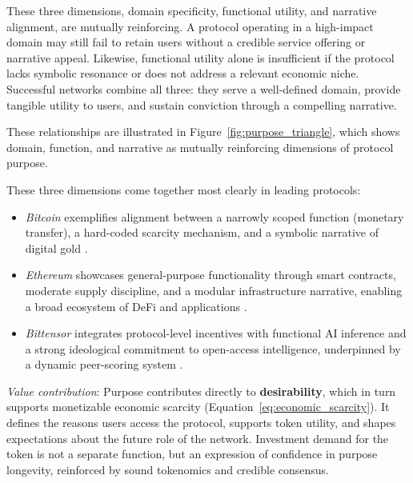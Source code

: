 \documentclass[12pt]{article}
\begin{document}
These three dimensions, domain specificity, functional utility, and narrative alignment, are mutually reinforcing. A protocol operating in a high-impact domain may still fail to retain users without a credible service offering or narrative appeal. Likewise, functional utility alone is insufficient if the protocol lacks symbolic resonance or does not address a relevant economic niche. Successful networks combine all three: they serve a well-defined domain, provide tangible utility to users, and sustain conviction through a compelling narrative.

These relationships are illustrated in Figure~\ref{fig:purpose_triangle}, 
which shows domain, function, and narrative as mutually reinforcing 
dimensions of protocol purpose.

These three dimensions come together most clearly in leading protocols:

\begin{itemize}
    \item \textit{Bitcoin} exemplifies alignment between a narrowly scoped function (monetary transfer), a hard-coded scarcity mechanism, and a symbolic narrative of digital gold \citep{nakamoto2008bitcoin, gans2019economics}.
    
    \item \textit{Ethereum} showcases general-purpose functionality through smart contracts, moderate supply discipline, and a modular infrastructure narrative, enabling a broad ecosystem of DeFi and applications \citep{buterin2022proof, cong2021tokenomics}.
    
    \item \textit{Bittensor} integrates protocol-level incentives with functional AI inference and a strong ideological commitment to open-access intelligence, underpinned by a dynamic peer-scoring system \citep{rao2023bittensor, gregory2025token}.
\end{itemize}


\textit{Value contribution}: Purpose contributes directly to \textbf{desirability}, which in turn supports monetizable economic scarcity (Equation~\ref{eq:economic_scarcity}). It defines the reasons users access the protocol, supports token utility, and shapes expectations about the future role of the network. Investment demand for the token is not a separate function, but an expression of confidence in purpose longevity, reinforced by sound tokenomics and credible consensus.
\end{document}
